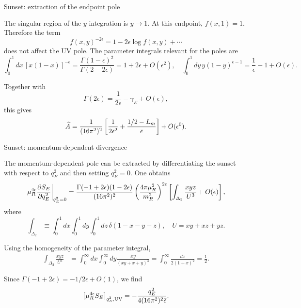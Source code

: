 \documentclass[aspectratio=169,10pt]{beamer}
\begin{document}
\begin{frame}{Sunset: extraction of the endpoint pole}

The singular region of the $y$ integration is $y\rightarrow1$. At this endpoint, $f(x,1)=1$. Therefore the term
\begin{equation}
f(x,y)^{-2\epsilon}
=
1-2\epsilon\log f(x,y)+\cdots
\end{equation}
does not affect the UV pole. The parameter integrals relevant for the poles are
\begin{equation}
\int_0^1dx\,[x(1-x)]^{-\epsilon}
=
\frac{\Gamma(1-\epsilon)^2}
{\Gamma(2-2\epsilon)}
=
1+2\epsilon+O(\epsilon^2),\quad 
\int_0^1dy\,
y(1-y)^{\epsilon-1}
=
\frac1\epsilon-1+O(\epsilon).
\end{equation}

Together with
\begin{equation}
\Gamma(2\epsilon)
=
\frac1{2\epsilon}-\gamma_E+O(\epsilon),
\end{equation}
this gives
\begin{equation}
\widehat A
=
\frac1{(16\pi^2)^2}
\left[
\frac1{2\bar\epsilon^2}
+
\frac{1/2-L_m}{\bar\epsilon}
\right]
+
O(\epsilon^0).
\end{equation}


\end{frame}


\begin{frame}{Sunset: momentum-dependent divergence}

The momentum-dependent pole can be extracted by differentiating
the sunset with respect to $q_E^2$ and then setting $q_E^2=0$. One obtains
\begin{equation}
\left.
\mu_R^{4\epsilon}
\frac{\partial S_E}{\partial q_E^2}
\right|_{q_E^2=0}
=
\frac{\Gamma(-1+2\epsilon)(1-2\epsilon)}
{(16\pi^2)^2}
\left(
\frac{4\pi\mu_R^2}{m_R^2}
\right)^{2\epsilon}
\left[
\int_{\Delta_2}
\frac{xyz}{U^3}
+
O(\epsilon)
\right],
\end{equation}
where
\begin{equation}
\int_{\Delta_2}
\equiv
\int_0^1dx\int_0^1dy\int_0^1dz\,
\delta(1-x-y-z),\quad U=xy+xz+yz.
\end{equation}

Using the homogeneity of the parameter integral,
\begin{align}
\int_{\Delta_2}
\frac{xyz}{U^3}
&=
\int_0^\infty dx
\int_0^\infty dy
\frac{xy}{(xy+x+y)^3} =
\int_0^\infty
\frac{dx}{2(1+x)^2}
=
\frac12.
\end{align}

Since $\Gamma(-1+2\epsilon) = -1/{2\epsilon}+O(1)$, we find
\begin{equation}
\left[
\mu_R^{4\epsilon}S_E
\right]_{q_E^2,\mathrm{UV}}
=
-\frac{q_E^2}
{4(16\pi^2)^2\bar\epsilon}.
\end{equation}


\end{frame}
\end{document}
